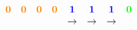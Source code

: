 \documentclass[10pt]{article}
\begin{document}
\begin{figure}[ht]
\begin{center}
\begin{animateinline}[loop, poster = first, controls={play, stop, step}]{0.5}
	\newframe
$	\begin{matrix}
	\textcolor{orange}{\mathbf{0}} &	
	\textcolor{orange}{\mathbf{0}} &	
	\textcolor{orange}{\mathbf{0}} &	
	\textcolor{orange}{\mathbf{0}} &	
	\textcolor{blue}{\mathbf{1}} &
	\textcolor{blue}{\mathbf{1}} &	
	\textcolor{blue}{\mathbf{1}} &
	\textcolor{green}{\mathbf{0}} \\	
    & & & & \rightarrow & \rightarrow & \rightarrow &     \\   
	\end{matrix}$

\end{animateinline}
\end{center}

\end{figure}
\end{document}
